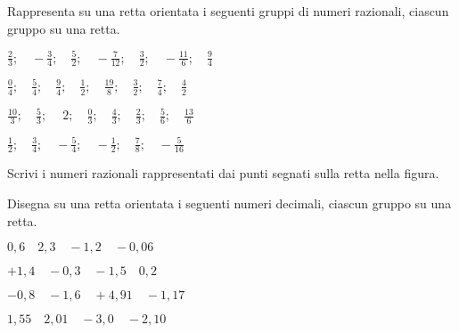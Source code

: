 \subsubsection*{}

\begin{esercizio}
 \label{ese:3.26}
Rappresenta su una retta orientata i seguenti gruppi di numeri razionali, 
ciascun gruppo su una retta.

\begin{multicols}{2}
\begin{enumeratea}
\spazielenx
 \item 
\(\displaystyle{\frac{2}{3};\quad-\frac{3}{4};\quad\frac{5}{2};\quad-\frac{7}{12
}
;\quad\frac{3}{2};\quad%
-\frac{11}{6};\quad\frac{9}{4}}\)
 \item 
\(\displaystyle{\frac{0}{4};\quad\frac{5}{4};\quad\frac{9}{4};\quad\frac{1}{2};
\quad\frac{19}{8};\quad\frac{3}{2}%
;\quad\frac{7}{4};\quad\frac{4}{2}}\)
 \item 
\(\displaystyle{\frac{10}{3};\quad\frac{5}{3};\quad~2;\quad\frac{0}{3}
;\quad\frac
{4}{3};\quad\frac{2}{3}%
;\quad\frac{5}{6};\quad\frac{13}{6}}\)
 \item 
\(\displaystyle{\frac{1}{2};\quad\frac{3}{4};\quad-\frac{5}{4};
\quad-\frac{1}{2};\quad\frac{7}{8};\quad-\frac{5}{16}}\)
 \end{enumeratea}
\end{multicols}
\end{esercizio}

\begin{esercizio}
 \label{ese:3.27}
 Scrivi i numeri razionali rappresentati dai punti segnati sulla retta nella 
 figura.
\begin{center}

\end{center}

\end{esercizio}

\begin{esercizio}
 \label{ese:3.28}
Disegna su una retta orientata i seguenti numeri decimali, ciascun gruppo su 
una retta.
\begin{multicols}{2}
\begin{enumeratea}
 \item \(0,6\quad2,3\quad-1,2\quad-0,06\)
 \item \(+1,4\quad-0,3\quad-1,5\quad0,2\)
 \item \(-0,8\quad-1,6\quad+4,91\quad-1,17\)
 \item \(1,55\quad2,01\quad-3,0\quad-2,10\)
\end{enumeratea}
\end{multicols}
\end{esercizio}

